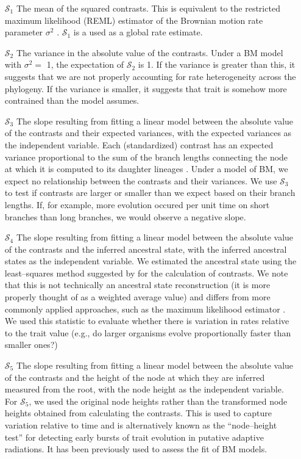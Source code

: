 \documentclass[a4paper,12pt]{article}
\begin{document}
\begin{enumerate}
\item[$\mathcal{S}_1$] The mean of the squared contrasts. This is equivalent to the restricted maximum likelihood (REML) estimator of the Brownian motion rate parameter $\sigma^2$ \citep{Garland1992, Rohlf2001}. $\mathcal{S}_1$ is a used as a global rate estimate.

\item[$\mathcal{S}_2$] The variance in the absolute value of the contrasts. Under a BM model with $\sigma^2 =$ 1, the expectation of $\mathcal{S}_2$ is 1. If the variance is greater than this, it suggests that we are not properly accounting for rate heterogeneity across the phylogeny. If the variance is smaller, it suggests that trait is somehow more contrained than the model assumes.

\item[$\mathcal{S}_3$] The slope resulting from fitting a linear model between the absolute value of the contrasts and their expected variances, with the expected variances as the independent variable. Each (standardized) contrast has an expected variance proportional to the sum of the branch lengths connecting the node at which it is computed to its daughter lineages  \citep{Felsenstein1985}. Under a model of BM, we expect no relationship between the contrasts and their variances. We use $\mathcal{S}_3$ to test if contrasts are larger or smaller than we expect based on their branch lengths. If, for example, more evolution occured per unit time on short branches than long branches, we would observe a negative slope.

\item[$\mathcal{S}_4$] The slope resulting from fitting a linear model between the absolute value of the contrasts and the inferred ancestral state, with the inferred ancestral states as the independent variable. We estimated the ancestral state using the least--squares method suggested by \citep{Felsenstein1985} for the calculation of contrasts. We note that this is not technically an ancestral state reconstruction (it is more properly thought of as a weighted average value) and differs from more commonly applied approaches, such as the  maximum likelihood estimator \citep{Schluter1997}. We used this statistic to evaluate whether there is variation in rates relative to the trait value (e.g., do larger organisms evolve proportionally faster than smaller ones?)

\item[$\mathcal{S}_5$] The slope resulting from fitting a linear model between the absolute value of the contrasts and the height of the node at which they are inferred measured from the root, with the node height as the independent variable. For $\mathcal{S}_5$, we used the original node heights rather than the transformed node heights obtained from calculating the contrasts. This is used to capture variation relative to time and is alternatively known as the ``node--height test'' \citep{FreckletonHarvey2006, SlaterPennell} for detecting early bursts of trait evolution in putative adaptive radiations. It has been  previously used to assess the fit of BM models.


\end{enumerate}
\end{document}
